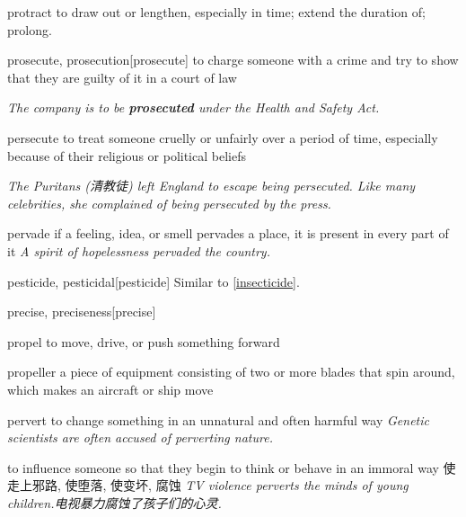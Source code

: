 \begin{DefWord}{protract}
    to draw out or lengthen, especially in time; extend the duration of; prolong.
\end{DefWord}

\begin{DefWord}{prosecute, prosecution}[prosecute]
    to charge someone with a crime and try to show that they are guilty of it in a court of law

    \textit{The company is to be \textbf{prosecuted} under the Health and Safety Act.}
\end{DefWord}

\begin{DefWord}{persecute}
    to treat someone cruelly or unfairly over a period of time, especially because of their religious or political beliefs

    \textit{The Puritans (清教徒) left England to escape being persecuted. Like many celebrities, she complained of being persecuted by the press.}
\end{DefWord}

\begin{DefWord}{pervade}
    if a feeling, idea, or smell pervades a place, it is present in every part of it
    \textit{A spirit of hopelessness pervaded the country.}
\end{DefWord}

\begin{DefWord}{pesticide, pesticidal}[pesticide]
    Similar to \ref{insecticide}.
\end{DefWord}


\begin{DefWord}{precise, preciseness}[precise]
\end{DefWord}

\begin{DefWord}{propel}
    to move, drive, or push something forward
\end{DefWord}


\begin{DefWord}{propeller}
    a piece of equipment consisting of two or more blades that spin around, which makes an aircraft or ship move
\end{DefWord}

\begin{DefWord}{pervert}
    to change something in an unnatural and often harmful way
    \textit{Genetic scientists are often accused of perverting nature.}

    to influence someone so that they begin to think or behave in an immoral way 使走上邪路, 使堕落, 使变坏, 腐蚀
    \textit{TV violence perverts the minds of young children.电视暴力腐蚀了孩子们的心灵. }
\end{DefWord}

